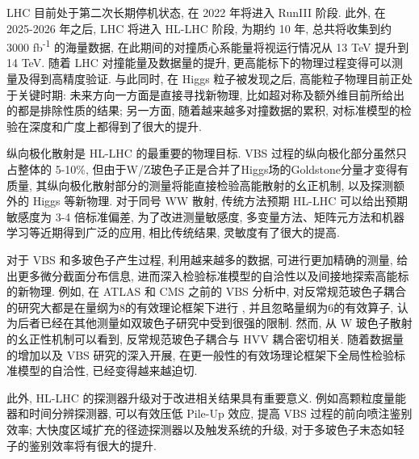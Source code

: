 \documentclass{SCIS2020cn}
\begin{document}
LHC 目前处于第二次长期停机状态, 在 2022 年将进入 RunIII 阶段. 此外, 在 2025-2026 年之后, LHC 将进入 HL-LHC 阶段, 为期约 10 年, 总共将收集到约 3000 fb\textsuperscript{-1} 的海量数据, 在此期间的对撞质心系能量将视运行情况从 13 TeV 提升到 14 TeV. 随着 LHC 对撞能量及数据量的提升, 更高能标下的物理过程变得可以测量及得到高精度验证. 与此同时, 在 Higgs 粒子被发现之后, 高能粒子物理目前正处于关键时期: 未来方向一方面是直接寻找新物理, 比如超对称及额外维目前所给出的都是排除性质的结果; 另一方面, 随着越来越多对撞数据的累积, 对标准模型的检验在深度和广度上都得到了很大的提升.

纵向极化散射是 HL-LHC 的最重要的物理目标. VBS 过程的纵向极化部分虽然只占整体的 5-10\%, 但由于W/Z玻色子正是合并了Higgs场的Goldstone分量才变得有质量, 其纵向极化散射部分的测量将能直接检验高能散射的幺正机制, 以及探测额外的 Higgs 等新物理. 对于同号 WW 散射, 传统方法预期 HL-LHC 可以给出预期敏感度为 3-4 倍标准偏差, 为了改进测量敏感度, 多变量方法、矩阵元方法和机器学习等近期得到广泛的应用, 相比传统结果, 灵敏度有了很大的提高.

对于 VBS 和多玻色子产生过程, 利用越来越多的数据, 可进行更加精确的测量, 给出更多微分截面分布信息, 进而深入检验标准模型的自洽性以及间接地探索高能标的新物理. 例如, 在 ATLAS 和 CMS 之前的 VBS 分析中, 对反常规范玻色子耦合的研究大都是在量纲为8的有效理论框架下进行 , 并且忽略量纲为6的有效算子, 认为后者已经在其他测量如双玻色子研究中受到很强的限制. 然而, 从 W 玻色子散射的幺正性机制可以看到, 反常规范玻色子耦合与 HVV 耦合密切相关. 随着数据量的增加以及 VBS 研究的深入开展, 在更一般性的有效场理论框架下全局性检验标准模型的自洽性, 已经变得越来越迫切.

此外, HL-LHC 的探测器升级对于改进相关结果具有重要意义. 例如高颗粒度量能器和时间分辨探测器, 可以有效压低 Pile-Up 效应, 提高 VBS 过程的前向喷注鉴别效率; 大快度区域扩充的径迹探测器以及触发系统的升级, 对于多玻色子末态如轻子的鉴别效率将有很大的提升.

\newpage
{}

\end{document}
